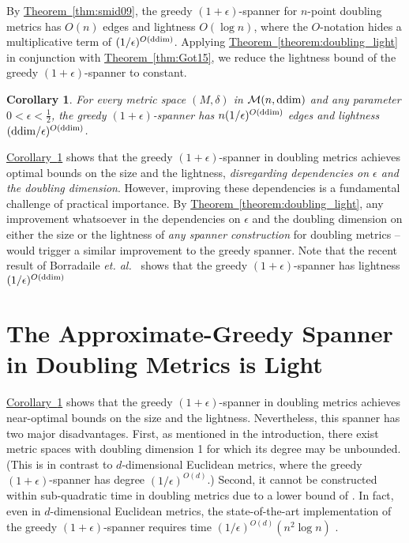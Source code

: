 \documentclass[11pt,letterpaper]{article}
\newtheorem{corollary}{Corollary}
\newcommand{\ddim}{{\rm ddim}}
\newcommand{\etal}{\emph{et. al.}}
\newcommand{\eps}{\epsilon}
\newcommand{\namedref}[2]{\hyperref[#2]{#1~\ref*{#2}}}
\newcommand{\theoremref}[1]{\namedref{Theorem}{#1}}
\newcommand{\corollaryref}[1]{\namedref{Corollary}{#1}}
\begin{document}
By \theoremref{thm:smid09}, the greedy $(1+\eps)$-spanner for $n$-point doubling metrics
has $O(n)$ edges and lightness $O(\log n)$,
where the $O$-notation hides a multiplicative term of $(1/\epsilon)^{O(\ddim)}$.
Applying \theoremref{theorem:doubling_light} in conjunction with  \theoremref{thm:Got15}, we reduce the lightness bound of the greedy $(1+\eps)$-spanner to constant.
\begin{corollary}\label{cor:Greedy_G}
	For every metric space $(M,\delta)$  in $\mathcal{M}(n,\ddim)$ and any parameter $0<\epsilon<\frac{1}{2}$,  the greedy $(1+\epsilon)$-spanner has
	$n(1/\epsilon)^{O(\ddim)}$  edges and lightness $(\ddim/\epsilon)^{O(\ddim)}$.
\end{corollary}
\corollaryref{cor:Greedy_G} shows that the greedy $(1+\eps)$-spanner in doubling metrics achieves optimal bounds on the size and the lightness, \emph{disregarding dependencies on $\eps$ and the doubling dimension}.
However, improving these dependencies is a fundamental challenge of practical importance.
By \theoremref{theorem:doubling_light}, any improvement whatsoever in the dependencies on $\eps$ and the doubling dimension
on either the size or the lightness of \emph{any spanner construction} for doubling metrics -- would trigger a similar improvement to the greedy spanner.
Note that the recent result of Borradaile \etal ~\cite{BLW19} shows that the greedy $(1+\eps)$-spanner has lightness  $(1/\epsilon)^{O(\ddim)}$



\section{The Approximate-Greedy Spanner in Doubling Metrics is Light}\label{sec:Fast_alg}
\corollaryref{cor:Greedy_G} shows that the greedy $(1+\eps)$-spanner in doubling metrics achieves near-optimal bounds on the size and the lightness.
Nevertheless, this spanner has two major disadvantages.
First, as mentioned in the introduction, there exist metric spaces with doubling dimension 1 for which its degree may be unbounded.
(This is in contrast to $d$-dimensional Euclidean metrics, where the greedy $(1+\eps)$-spanner has degree $(1/\eps)^{O(d)}$.)
Second, it cannot be constructed within sub-quadratic time in doubling metrics due to a lower bound of \cite{HM06}.
In fact, even in $d$-dimensional Euclidean metrics, the state-of-the-art implementation of the greedy $(1+\eps)$-spanner requires time $(1/\eps)^{O(d)} (n^2 \log n)$ \cite{BCFMS10}.
\end{document}
